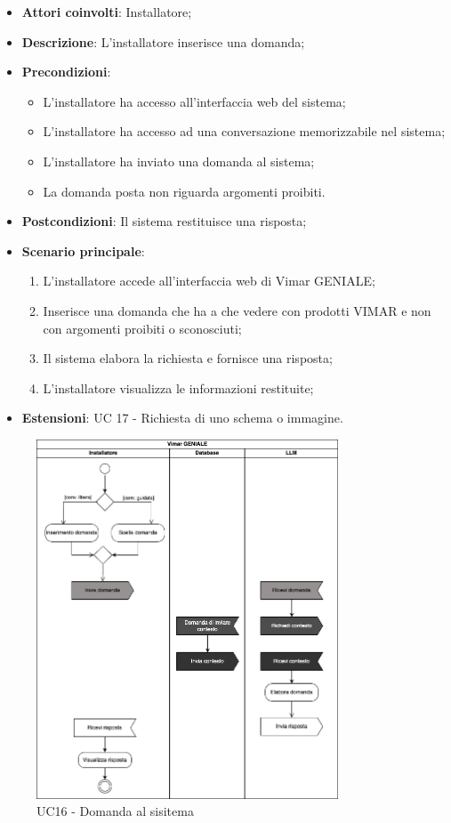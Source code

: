 \begin{itemize}
    \item \textbf{Attori coinvolti}: Installatore;
    \item \textbf{Descrizione}: L’installatore inserisce una domanda;
    \item \textbf{Precondizioni}: 
        \begin{itemize}
            \item L’installatore ha accesso all’interfaccia web del sistema;
            \item L’installatore ha accesso ad una conversazione memorizzabile nel sistema;
            \item L'installatore ha inviato una domanda al sistema;
            \item La domanda posta non riguarda argomenti proibiti.
        \end{itemize}
    \item \textbf{Postcondizioni}: Il sistema restituisce una risposta;
    \item \textbf{Scenario principale}:
    \begin{enumerate}
    \item L’installatore accede all’interfaccia web di Vimar GENIALE;
    \item Inserisce una domanda che ha a che vedere con prodotti VIMAR e non con argomenti proibiti o sconosciuti;
    \item Il sistema elabora la richiesta e fornisce una risposta;
    \item L’installatore visualizza le informazioni restituite;
    \end{enumerate}
    \item \textbf{Estensioni}: UC 17 - Richiesta di uno schema o immagine.
\end{itemize}
\begin{figure}[H]
\centering
\includegraphics[width=0.8\textwidth]{contents/casi_duso/png/UC16_activity.png}
\caption{UC16 - Domanda al sisitema}
\end{figure}

